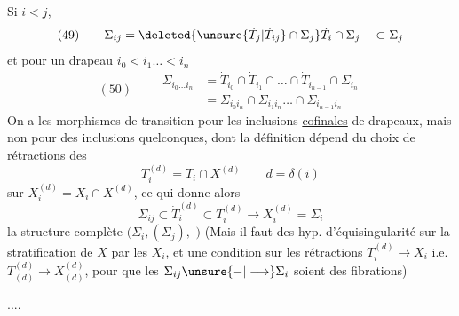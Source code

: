 Si $i<j$, 
\[
(49)\qquad\Sigma_{ij}=\deleted{\unsure{\dot T_j|\dot T_{ij}}\cap\Sigma_j}
\dot T_i\cap\Sigma_j\quad\subset\Sigma_j
\]
et pour un drapeau $i_0<i_1\ldots<i_n$
\[
(50)\qquad\begin{aligned}
\Sigma_{i_0\ldots i_n}&=\dot T_{i_0}\cap\dot T_{i_1}\cap\ldots\cap
\dot T_{i_{n-1}}\cap\Sigma_{i_n}\\
&=\Sigma_{i_0i_n}\cap\Sigma_{i_1i_n}\ldots\cap\Sigma_{i_{n-1}i_n}
\end{aligned}
\]
On a  les morphismes de transition
 pour les
 inclusions \uline{cofinales} de drapeaux,
mais non pour des inclusions quelconques, dont la définition dépend
du choix de rétractions des
\[
T_i^{(d)}=T_i\cap X^{(d)}\qquad d=\delta(i)
\]
sur $X_i^{(d)}=X_i\cap X^{(d)}$, ce qui donne alors
\[
\Sigma_{ij}\subset\dot T_i^{(d)}\subset T_i^{(d)}
\longrightarrow X_i^{(d)}=\Sigma_i
\]
la structure complète
$(\Sigma_i,(\Sigma_j),$
$)$
(Mais il faut des hyp. d'équisingularité sur la
 stratification de $X$ par les $X_i$,
et une condition 
sur les rétractions
$T_i^{(d)}\longrightarrow X_i$ i.e. 
$T_{(d)}^{(d)}\longrightarrow X_{(d)}^{(d)}$,
pour que les $\Sigma_{ij}\unsure{-|\longrightarrow}\Sigma_i$ soient des fibrations)

....
